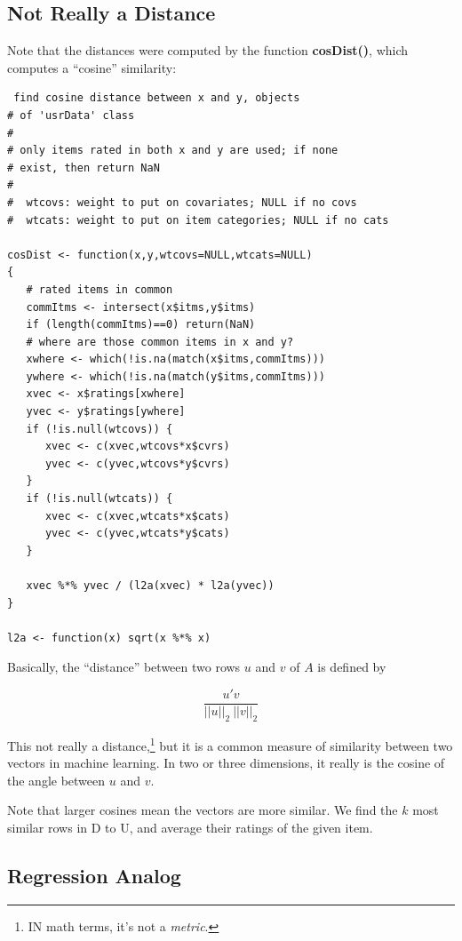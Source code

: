 \subsection{Not Really a Distance}

Note that the distances were computed by the function
\textbf{cosDist()}, which computes a ``cosine'' similarity:

\begin{lstlisting}
 find cosine distance between x and y, objects 
# of 'usrData' class 
# 
# only items rated in both x and y are used; if none 
# exist, then return NaN 
# 
#  wtcovs: weight to put on covariates; NULL if no covs 
#  wtcats: weight to put on item categories; NULL if no cats 
 
cosDist <- function(x,y,wtcovs=NULL,wtcats=NULL) 
{ 
   # rated items in common 
   commItms <- intersect(x$itms,y$itms) 
   if (length(commItms)==0) return(NaN) 
   # where are those common items in x and y? 
   xwhere <- which(!is.na(match(x$itms,commItms))) 
   ywhere <- which(!is.na(match(y$itms,commItms))) 
   xvec <- x$ratings[xwhere] 
   yvec <- y$ratings[ywhere] 
   if (!is.null(wtcovs)) { 
      xvec <- c(xvec,wtcovs*x$cvrs) 
      yvec <- c(yvec,wtcovs*y$cvrs) 
   } 
   if (!is.null(wtcats)) { 
      xvec <- c(xvec,wtcats*x$cats) 
      yvec <- c(yvec,wtcats*y$cats) 
   } 
 
   xvec %*% yvec / (l2a(xvec) * l2a(yvec)) 
}

l2a <- function(x) sqrt(x %*% x) 
\end{lstlisting}

Basically, the ``distance'' between two rows $u$ and $v$
of $A$ is defined by

\begin{equation}
\frac{u'v}{||u||_2 ~ ||v||_2}
\end{equation}

This not really a distance,\footnote{IN math terms, it's not a
\textit{metric}.} but it is a common measure of similarity between two
vectors in machine learning.  In two or three dimensions, it really is
the cosine of the angle between $u$ and $v$.  

Note that larger cosines mean the vectors are more similar.  We find the
$k$ most similar rows in D to U, and average their ratings of the given
item.

\subsection{Regression Analog}

